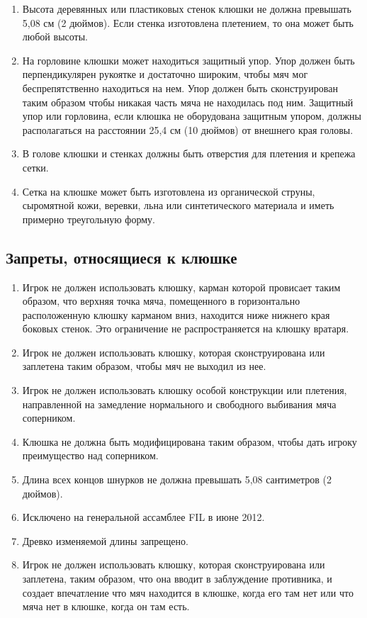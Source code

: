 \documentclass[../main.tex]{subfiles}
\begin{document}
\begin{enumerate}
\begin{itemize}
      \end{itemize}
      \item Высота деревянных или пластиковых стенок клюшки не должна превышать 5,08 см (2 дюймов). Если стенка изготовлена плетением, то она может быть любой высоты.
      \item На горловине клюшки может находиться защитный упор.\newline
      Упор должен быть перпендикулярен рукоятке и достаточно широким, чтобы мяч мог беспрепятственно находиться на нем.\newline
      Упор должен быть сконструирован таким образом чтобы никакая часть мяча не находилась под ним.\newline
      Защитный упор или горловина, если клюшка не оборудована защитным упором, должны располагаться на расстоянии 25,4 см (10 дюймов) от внешнего края головы.
      \item В голове клюшки и стенках должны быть отверстия для плетения и крепежа сетки.
      \item Сетка на клюшке может быть изготовлена из органической струны, сыромятной кожи, веревки, льна или синтетического материала и иметь примерно треугольную форму.
    \end{enumerate}

    \subsection{Запреты, относящиеся к клюшке}
    \begin{enumerate}
\item Игрок не должен использовать клюшку, карман которой провисает таким образом, что верхняя точка мяча, помещенного в горизонтально расположенную клюшку карманом вниз, находится ниже нижнего края боковых стенок. Это ограничение не распространяется на клюшку вратаря.
\item Игрок не должен использовать клюшку, которая сконструирована или заплетена таким образом, чтобы мяч не выходил из нее.
\item Игрок не должен использовать клюшку особой конструкции или плетения, направленной на замедление нормального и свободного выбивания мяча соперником.
\item Клюшка не должна быть модифицирована таким образом, чтобы дать игроку преимущество над соперником.
\item Длина всех концов шнурков не должна превышать 5,08 сантиметров (2 дюймов).
\item Исключено на генеральной ассамблее FIL в июне 2012.
\item Древко изменяемой длины запрещено.
\item Игрок не должен использовать клюшку, которая сконструирована или заплетена, таким образом, что она вводит в заблуждение противника, и создает впечатление что мяч находится в клюшке, когда его там нет или что мяча нет в клюшке, когда он там есть.
\end{enumerate}
\end{document}
